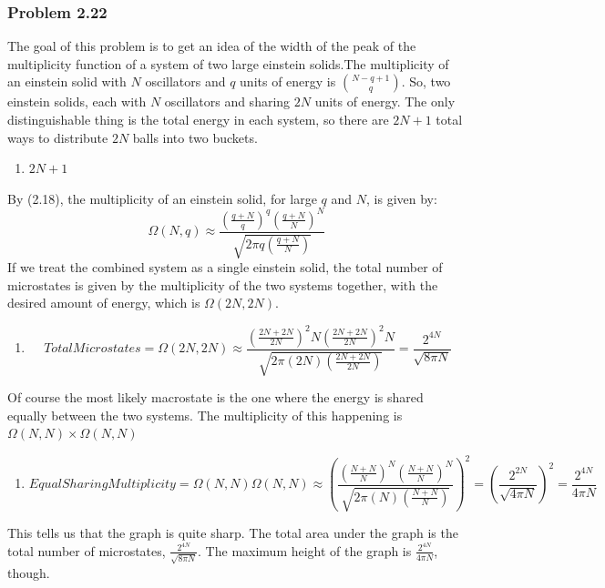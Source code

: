 \documentclass[letterpaper,10pt,english]{/usr/local/lib/python2.7/dist-packages/sphinx/texinputs/sphinxhowto}
\begin{document}
        
    
\subsubsection{Problem 2.22}The goal of this problem is to get an idea of the width of the peak of
the multiplicity function of a system of two large einstein solids.The multiplicity of an einstein solid with \(N\) oscillators and \(q\)
units of energy is \({{N-q+1} \choose q}\). So, two einstein solids,
each with \(N\) oscillators and sharing \(2N\) units of energy. The only
distinguishable thing is the total energy in each system, so there are
\(2N+1\) total ways to distribute \(2N\) balls into two buckets.

\begin{enumerate}
\def\labelenumi{\alph{enumi})}
\itemsep1pt\parskip0pt
\item
  \(2N + 1\)
\end{enumerate}By (2.18), the multiplicity of an einstein solid, for large \(q\) and
\(N\), is given by: \[
\Omega(N,q) \approx \frac{\left( \frac{q+N}{q} \right)^q \left( \frac{q+N}{N} \right)^N}{\sqrt{2 \pi q \left( \frac{q + N}{N} \right) }}
\]If we treat the combined system as a single einstein solid, the total
number of microstates is given by the multiplicity of the two systems
together, with the desired amount of energy, which is \(\Omega(2N,2N)\).\begin{enumerate}
\def\labelenumi{\alph{enumi})}
\setcounter{enumi}{1}
\itemsep1pt\parskip0pt
\item
  \[
  TotalMicrostates
  =
  \Omega(2N,2N) 
  \approx 
  \frac{\left( \frac{2N+2N}{2N} \right)^2N \left( \frac{2N+2N}{2N} \right)^2N}{\sqrt{2 \pi (2N) \left( \frac{2N + 2N}{2N} \right) }}
  =
  \frac{2^{4N}}{\sqrt{8 \pi N}}
  \]
\end{enumerate}Of course the most likely macrostate is the one where the energy is
shared equally between the two systems. The multiplicity of this
happening is \(\Omega(N,N) \times \Omega(N,N)\)

\begin{enumerate}
\def\labelenumi{\alph{enumi})}
\setcounter{enumi}{2}
\itemsep1pt\parskip0pt
\item
  \[
  EqualSharingMultiplicity
  = 
  \Omega(N,N)\Omega(N,N)
  \approx
  \left( \frac{\left( \frac{N+N}{N} \right)^N \left( \frac{N+N}{N} \right)^N}{\sqrt{2 \pi (N) \left( \frac{N + N}{N} \right) }} \right)^2
  =
  \left( \frac{ 2^{2N} }{\sqrt{4 \pi N}} \right)^2
  =
  \frac{2^{4N}}{4 \pi N}
  \]
\end{enumerate}This tells us that the graph is quite sharp. The total area under the
graph is the total number of microstates,
\(\frac{2^{4N}}{\sqrt{8 \pi N}}\). The maximum height of the graph is
\(\frac{2^{4N}}{4 \pi N}\), though.
\end{document}
